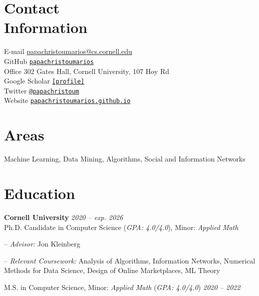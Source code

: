 \documentclass[margin]{res}
\newcommand{\field}[2]{\noindent \textbf{#1} \hfill #2 \\}
\newcommand{\specialurl}[2]{\href {#2} {\texttt{[#1]}}}
\begin{document}

\begin{resume}

\section{Contact \\ Information} 
E-mail \hfill \url{papachristoumarios@cs.cornell.edu} \\
GitHub \hfill \href{http://github.com/papachristoumarios}{\nolinkurl{papachristoumarios}} \\
Office \hfill 302 Gates Hall, Cornell University, 107 Hoy Rd \\
Google Scholar \hfill \specialurl{profile}{https://scholar.google.gr/citations?user=T12JO3MAAAAJ&hl=en} \\
Twitter \hfill \href{https://twitter.com/papachristoum}{\nolinkurl {@papachristoum}} \\
Website \hfill \href{https://papachristoumarios.github.io}{\nolinkurl {papachristoumarios.github.io}}

\section{Areas} Machine Learning, Data Mining, Algorithms, Social and Information Networks

\section{Education}
\field {Cornell University} {\emph{2020 -- exp. 2026}}
Ph.D. Candidate in Computer Science (\emph{GPA: 4.0/4.0}), Minor: \emph{Applied Math}
\begin{compactitem}
\item[--] \emph{Advisor:} Jon Kleinberg
\item[--] \emph{Relevant Coursework:} Analysis of Algorithms, Information Networks, Numerical Methods for Data Science, Design of Online Marketplaces, ML Theory
\end{compactitem} 

M.S. in Computer Science, Minor: \emph{Applied Math} (\emph{GPA: 4.0/4.0}) \hfill {\emph{2020 -- 2022}}
 

\end{resume}
\end{document}
